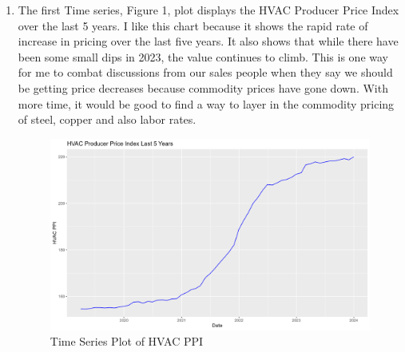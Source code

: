 \documentclass{article}
\begin{document}
\begin{enumerate}
    \item The first Time series, Figure 1, plot displays the HVAC Producer Price Index over the last 5 years. I like this chart because it shows the rapid rate of increase in pricing over the last five years. It also shows that while there have been some small dips in 2023, the value continues to climb. This is one way for me to combat discussions from our sales people when they say we should be getting price decreases because commodity prices have gone down. With more time, it would be good to find a way to layer in the commodity pricing of steel, copper and also labor rates.
    \begin{figure}
        \centering
        \includegraphics[width=1\linewidth]{PS6a_Smith.png}
        \caption{Time Series Plot of HVAC PPI}
        \label{fig:enter-label}
    \end{figure}
\end{enumerate}
\end{document}
